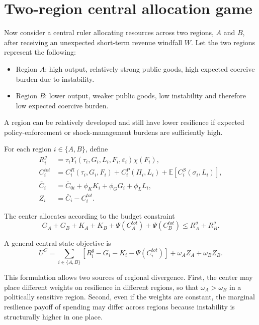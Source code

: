 \documentclass[12pt]{article}
\newcommand{\E}{\mathbb{E}}
\begin{document}
\section{Two-region central allocation game}

Now consider a central ruler allocating resources across two regions, $A$ and $B$, after receiving an unexpected short-term revenue windfall $W$. Let the two regions represent the following:
\begin{itemize}
    \item Region $A$: high output, relatively strong public goods, high expected coercive burden due to instability.
    \item Region $B$: lower output, weaker public goods, low instability and therefore low expected coercive burden.
\end{itemize}
A region can be relatively developed and still have lower resilience if expected policy-enforcement or shock-management burdens are sufficiently high.

For each region $i \in \{A,B\}$, define
\begin{align}
R_i^g &= \tau_i Y_i(\tau_i,G_i,L_i,F_i,\varepsilon_i)\chi(F_i), \\
C_i^{tot} &= C_i^R(\tau_i,G_i,F_i) + C_i^P(\Pi_i,L_i) + \E[C_i^S(\sigma_i,L_i)], \\
\bar C_i &= \bar C_{0i} + \phi_K K_i + \phi_G G_i + \phi_L L_i, \\
Z_i &= \bar C_i - C_i^{tot}.
\end{align}

The center allocates according to the budget constraint
\begin{equation}
G_A + G_B + K_A + K_B + \Psi(C_A^{tot}) + \Psi(C_B^{tot}) \le R_A^g + R_B^g.
\end{equation}

A general central-state objective is
\begin{equation}
U^C = \sum_{i \in \{A,B\}} \left[ R_i^g - G_i - K_i - \Psi(C_i^{tot}) \right] + \omega_A Z_A + \omega_B Z_B.
\label{eq:center}
\end{equation}

This formulation allows two sources of regional divergence. First, the center may place different weights on resilience in different regions, so that $\omega_A > \omega_B$ in a politically sensitive region. Second, even if the weights are constant, the marginal resilience payoff of spending may differ across regions because instability is structurally higher in one place.
\end{document}
